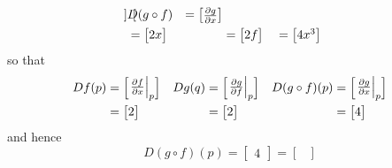 \documentclass[../notes.tex]{subfiles}
\begin{document}
\begin{itemize}
\begin{itemize}
\begin{align*}
\begin{bmatrix}
                \end{bmatrix}&
                    D(g\circ f) &=
                    \begin{bmatrix}
                        \pdv{g}{x}
                    \end{bmatrix}\\
            &=
            \begin{bmatrix}
                2x
            \end{bmatrix}&
                &=
                \begin{bmatrix}
                    2f
                \end{bmatrix}&
                    &=
                    \begin{bmatrix}
                        4x^3
                    \end{bmatrix}
        \end{align*}
        so that
        \begin{align*}
            Df(p) &=
            \begin{bmatrix}
                \eval{\pdv{f}{x}}_p
            \end{bmatrix}&
                Dg(q) &=
                \begin{bmatrix}
                    \eval{\pdv{g}{f}}_p
                \end{bmatrix}&
                    D(g\circ f)(p) &=
                    \begin{bmatrix}
                        \eval{\pdv{g}{x}}_p
                    \end{bmatrix}\\
            &=
            \begin{bmatrix}
                2
            \end{bmatrix}&
                &=
                \begin{bmatrix}
                    2
                \end{bmatrix}&
                    &=
                    \begin{bmatrix}
                        4
                    \end{bmatrix}
        \end{align*}
        and hence
        \begin{equation*}
            D(g\circ f)(p) =
            \begin{bmatrix}
                4
            \end{bmatrix}
            =
            \begin{bmatrix}

\end{bmatrix}
\end{equation*}
\end{itemize}
\end{itemize}
\end{document}
